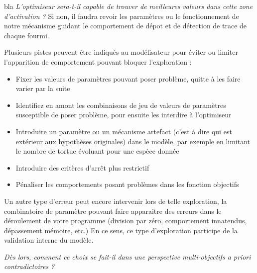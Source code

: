 \begin{framewithtitle}[bla]{bla}
\textit{L'optimiseur sera-t-il capable de trouver de meilleures valeurs dans cette zone d'activation ?} Si non, il faudra revoir les paramètres ou le fonctionnement de notre mécanisme guidant le comportement de dépot et de détection de trace de chaque fourmi.

Plusieurs pistes peuvent être indiqués au modélisateur pour éviter ou limiter l'apparition de comportement pouvant bloquer l'exploration :

\begin{itemize}[noitemsep,nolistsep]
	\item Fixer les valeurs de paramètres pouvant poser problème, quitte à les faire varier par la suite
	\item Identifiez en amont les combinaisons de jeu de valeurs de paramètres susceptible de poser problème, pour ensuite les interdire à l'optimiseur
	\item Introduire un paramètre ou un mécanisme artefact (c'est à dire qui est extérieur aux hypothèses originales) dans le modèle, par exemple en limitant le nombre de tortue évoluant pour une espèce donnée
	\item Introduire des critères d'arrêt plus restrictif 
	\item Pénaliser les comportements posant problèmes dans les fonction objectifs
\end{itemize}

Un autre type d'erreur peut encore intervenir lors de telle exploration, la combinatoire de paramètre pouvant faire apparaitre des erreurs dans le déroulement de votre programme (division par zéro, comportement innatendus, dépassement mémoire, etc.) En ce sens, ce type d'exploration participe de la validation interne du modèle.

\end{framewithtitle}

\textit{Dès lors, comment ce choix se fait-il dans une perspective multi-objectifs a priori contradictoires ?}

